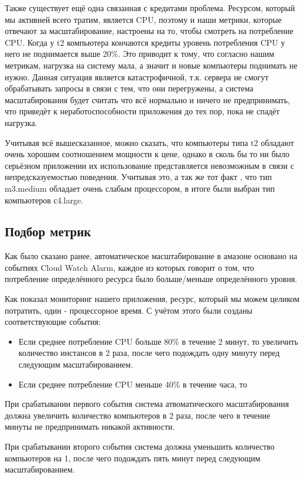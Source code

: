 	Также существует ещё одна связанная с кредитами проблема. Ресурсом, который мы активней всего тратим, является CPU, поэтому и наши метрики, которые отвечают за масштабирование, настроены на то, чтобы смотреть на потребление CPU. Когда у t2 компьютера кончаются кредиты уровень потребления CPU у него не поднимается выше 20\%. Это приводит к тому, что согласно нашим метрикам, нагрузка на систему мала, а значит и новые компьютеры поднимать не нужно. Данная ситуация является катастрофичной, т.к. сервера не смогут обрабатывать запросы в связи с тем, что они перегружены, а система масштабирования будет считать что всё нормально и ничего не предпринимать, что приведёт к неработоспособности приложения до тех пор, пока не спадёт нагрузка.
	
	Учитывая всё вышесказанное, можно сказать, что компьютеры типа t2 обладают очень хорошим соотношением мощности к цене, однако в сколь бы то ни было серьёзном приложении их использование представляется невозможным в связи с непредсказуемостью поведения. Учитывая это, а так же тот факт , что тип m3.medium обладает очень слабым процессором, в итоге были выбран тип компьютеров с4.large.
\subsection{Подбор метрик}
	Как было сказано ранее, автоматическое масштабирование в амазоне основано на событиях Cloud Watch Alarm, каждое из которых говорит о том, что потребление определённого ресурса было больше/меньше определённого уровня.
	
	Как показал мониторинг нашего приложения, ресурс, который мы можем целиком потратить, один - процессорное время. С учётом этого были созданы соответствующие события:
\begin{itemize}
	\item Если среднее потребление CPU больше 80\% в течение 2 минут, то увеличить количество инстансов в 2 раза, после чего подождать одну минуту перед следующим масштабированием.
	\item Если среднее потребление CPU меньше 40\% в течение часа, то 
\end{itemize}

	При срабатывании первого события система атвоматического масштабирования должна увеличить количество компьютеров в 2 раза, после чего в течение минуты не предпринимать никакой активности.
	
	При срабатывании второго события система должна уменьшить количество компьютеров на 1, после чего подождать пять минут перед следующим масштабированием.

